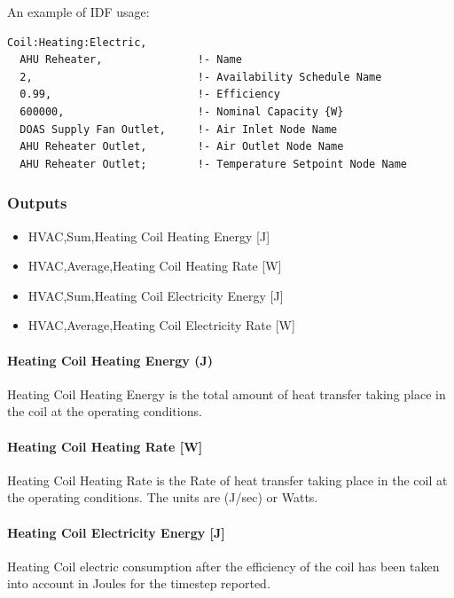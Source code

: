 An example of IDF usage:

\begin{lstlisting}
Coil:Heating:Electric,
  AHU Reheater,               !- Name
  2,                          !- Availability Schedule Name
  0.99,                       !- Efficiency
  600000,                     !- Nominal Capacity {W}
  DOAS Supply Fan Outlet,     !- Air Inlet Node Name
  AHU Reheater Outlet,        !- Air Outlet Node Name
  AHU Reheater Outlet;        !- Temperature Setpoint Node Name
\end{lstlisting}

\subsubsection{Outputs}\label{outputs-2-011}

\begin{itemize}
\item
  HVAC,Sum,Heating Coil Heating Energy {[}J{]}
\item
  HVAC,Average,Heating Coil Heating Rate {[}W{]}
\item
  HVAC,Sum,Heating Coil Electricity Energy {[}J{]}
\item
  HVAC,Average,Heating Coil Electricity Rate {[}W{]}
\end{itemize}

\paragraph{Heating Coil Heating Energy (J)}\label{heating-coil-heating-energy-j-2}

Heating Coil Heating Energy is the total amount of heat transfer taking place in the coil at the operating conditions.

\paragraph{Heating Coil Heating Rate {[}W{]}}\label{heating-coil-heating-rate-w-2}

Heating Coil Heating Rate is the Rate of heat transfer taking place in the coil at the operating conditions. The units are (J/sec) or Watts.

\paragraph{Heating Coil Electricity Energy {[}J{]}}\label{heating-coil-electric-energy-j}

Heating Coil electric consumption after the efficiency of the coil has been taken into account in Joules for the timestep reported.

